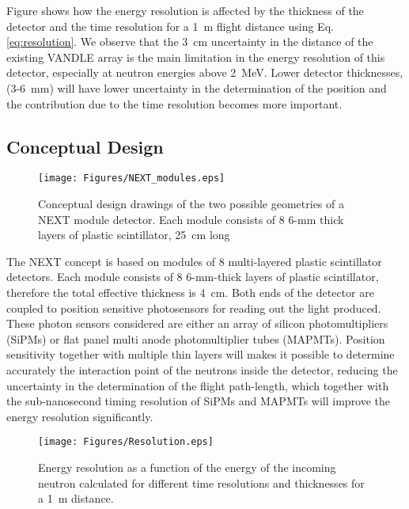 \documentclass[preprint,3p,twocolumn]{elsarticle}
\begin{document}
Figure \label{fig:resolution} shows how the energy resolution is  affected by the thickness of the detector and the time resolution for a 1~m flight distance using Eq. \eqref{eq:resolution}. We observe that the 3~cm uncertainty in the distance of the existing VANDLE \cite{PETERS2016122} array is the main limitation in the energy resolution of this detector, especially at neutron energies above 2~MeV. Lower detector thicknesses, (3-6~mm) will have lower uncertainty in the determination of the position and  the contribution due to the time resolution becomes more important.


\subsection{Conceptual Design}

\begin{figure}[tp]
\centering
\texttt{[image: Figures/NEXT\_modules.eps]}
\caption{Conceptual design  drawings of the two possible geometries of a NEXT module detector. Each  module consists of 8 6-mm thick layers of plastic scintillator, 25~cm long}
\label{fig:NEXT_modules}
\end{figure}


The NEXT concept is based on modules of 8 multi-layered plastic scintillator detectors. Each  module consists of 8 6-mm-thick layers of plastic scintillator, therefore the total effective thickness is 4~cm. Both ends of the detector are coupled to position sensitive photosensors for reading out the light produced. These photon sensors considered  are either an array of silicon photomultipliers (SiPMs) or flat panel multi anode photomultiplier tubes (MAPMTs). Position sensitivity together with multiple thin layers will makes it possible to determine  accurately the interaction point of the neutrons inside the detector, reducing the uncertainty in the determination of the flight path-length, which together with the sub-nanosecond timing resolution of SiPMs and MAPMTs will improve the energy resolution significantly.

\begin{figure}[tb]
\centering
\texttt{[image: Figures/Resolution.eps]}
\caption{Energy resolution as a function of the energy of the incoming neutron calculated for different time resolutions and thicknesses for a 1~m distance.}
\label{fig:resolution}
\end{figure}
\end{document}
